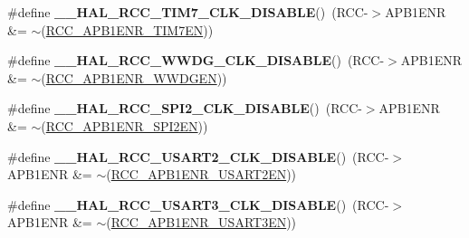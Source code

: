 \begin{DoxyCompactItemize}
\item 
\hypertarget{group___r_c_c___a_p_b1___clock___enable___disable_ga865f11c3f70a9b85ebc5f09baf60eec9}{\#define {\bfseries \-\_\-\-\_\-\-H\-A\-L\-\_\-\-R\-C\-C\-\_\-\-T\-I\-M7\-\_\-\-C\-L\-K\-\_\-\-D\-I\-S\-A\-B\-L\-E}()~(R\-C\-C-\/$>$A\-P\-B1\-E\-N\-R \&= $\sim$(\hyperlink{group___peripheral___registers___bits___definition_gab595fbaf4167297d8fe2825e41f41990}{R\-C\-C\-\_\-\-A\-P\-B1\-E\-N\-R\-\_\-\-T\-I\-M7\-E\-N}))}\label{group___r_c_c___a_p_b1___clock___enable___disable_ga865f11c3f70a9b85ebc5f09baf60eec9}

\item 
\hypertarget{group___r_c_c___a_p_b1___clock___enable___disable_ga6afa0a633cf2553743a494d97aa5b997}{\#define {\bfseries \-\_\-\-\_\-\-H\-A\-L\-\_\-\-R\-C\-C\-\_\-\-W\-W\-D\-G\-\_\-\-C\-L\-K\-\_\-\-D\-I\-S\-A\-B\-L\-E}()~(R\-C\-C-\/$>$A\-P\-B1\-E\-N\-R \&= $\sim$(\hyperlink{group___peripheral___registers___bits___definition_gaf712b922ee776a972d2efa3da0ea4733}{R\-C\-C\-\_\-\-A\-P\-B1\-E\-N\-R\-\_\-\-W\-W\-D\-G\-E\-N}))}\label{group___r_c_c___a_p_b1___clock___enable___disable_ga6afa0a633cf2553743a494d97aa5b997}

\item 
\hypertarget{group___r_c_c___a_p_b1___clock___enable___disable_gabb56a85a6424a60da8edc681f3a1c918}{\#define {\bfseries \-\_\-\-\_\-\-H\-A\-L\-\_\-\-R\-C\-C\-\_\-\-S\-P\-I2\-\_\-\-C\-L\-K\-\_\-\-D\-I\-S\-A\-B\-L\-E}()~(R\-C\-C-\/$>$A\-P\-B1\-E\-N\-R \&= $\sim$(\hyperlink{group___peripheral___registers___bits___definition_gafdce64692c44bf95efbf2fed054e59be}{R\-C\-C\-\_\-\-A\-P\-B1\-E\-N\-R\-\_\-\-S\-P\-I2\-E\-N}))}\label{group___r_c_c___a_p_b1___clock___enable___disable_gabb56a85a6424a60da8edc681f3a1c918}

\item 
\hypertarget{group___r_c_c___a_p_b1___clock___enable___disable_ga1edc6c83fbebf8b4265ef9500aa04b04}{\#define {\bfseries \-\_\-\-\_\-\-H\-A\-L\-\_\-\-R\-C\-C\-\_\-\-U\-S\-A\-R\-T2\-\_\-\-C\-L\-K\-\_\-\-D\-I\-S\-A\-B\-L\-E}()~(R\-C\-C-\/$>$A\-P\-B1\-E\-N\-R \&= $\sim$(\hyperlink{group___peripheral___registers___bits___definition_gab840af4f735ec36419d61c7db3cfa00d}{R\-C\-C\-\_\-\-A\-P\-B1\-E\-N\-R\-\_\-\-U\-S\-A\-R\-T2\-E\-N}))}\label{group___r_c_c___a_p_b1___clock___enable___disable_ga1edc6c83fbebf8b4265ef9500aa04b04}

\item 
\hypertarget{group___r_c_c___a_p_b1___clock___enable___disable_ga5b0866dac14f73ddeafa6308ac447bec}{\#define {\bfseries \-\_\-\-\_\-\-H\-A\-L\-\_\-\-R\-C\-C\-\_\-\-U\-S\-A\-R\-T3\-\_\-\-C\-L\-K\-\_\-\-D\-I\-S\-A\-B\-L\-E}()~(R\-C\-C-\/$>$A\-P\-B1\-E\-N\-R \&= $\sim$(\hyperlink{group___peripheral___registers___bits___definition_ga8033e0312aea02ae7eb2d57da13e8298}{R\-C\-C\-\_\-\-A\-P\-B1\-E\-N\-R\-\_\-\-U\-S\-A\-R\-T3\-E\-N}))}\label{group___r_c_c___a_p_b1___clock___enable___disable_ga5b0866dac14f73ddeafa6308ac447bec}


\end{DoxyCompactItemize}
